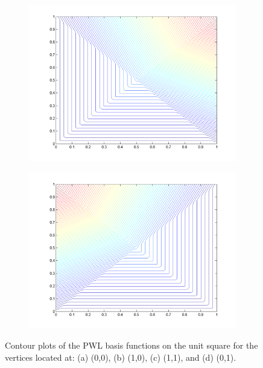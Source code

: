\begin{figure}
\begin{subfigure}[b]{0.48\textwidth}
		\caption{}
	\end{subfigure}
	\vfill
	\begin{subfigure}[b]{0.48\textwidth}
		\centering
		\includegraphics[width=\textwidth]{figures/sec_BF/PWL_square_contour_3.png}
		\caption{}
	\end{subfigure}
	\hfill
	\begin{subfigure}[b]{0.48\textwidth}
		\centering
		\includegraphics[width=\textwidth]{figures/sec_BF/PWL_square_contour_4.png}
		\caption{}
	\end{subfigure}
\caption{Contour plots of the PWL basis functions on the unit square for the vertices located at: (a) (0,0), (b) (1,0), (c) (1,1), and (d) (0,1).}
\end{figure}

